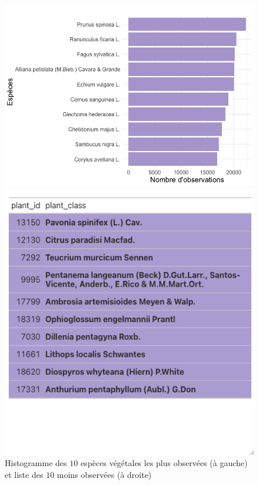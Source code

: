 \documentclass[a4paper,12pt]{article}
\begin{document}
\begin{figure}[H]
\centering
\begin{minipage}{0.55\textwidth}
  \includegraphics[width=\linewidth]{images/10_Most_Observed_Species.png}
\end{minipage}%
\hfill
\begin{minipage}{0.4\textwidth}
  \includegraphics[width=\linewidth]{images/10_Least_Observed_Species.png}
\end{minipage}
\caption{Histogramme des $10$ espèces végétales les plus observées (à gauche) et liste des $10$ moins observées (à droite)}
\label{fig:hist1}
\end{figure}
\end{document}
